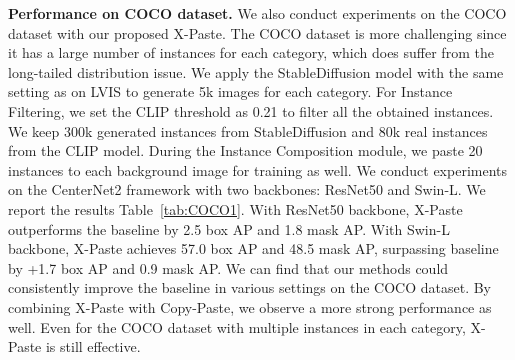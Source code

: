 \documentclass{article}
\begin{document}
\begin{table}[t]
  \small
  \centering
\caption{Comparison of open-vocabulary detection performance on LVIS, $^*$ means they use external supervised data for training.}
\label{tab:openLVIS}
\end{table}


\noindent \textbf{Performance on COCO dataset.} We also conduct experiments on the COCO dataset with our proposed X-Paste. The COCO dataset is more challenging since it has a large number of instances for each category, which does suffer from the long-tailed distribution issue. We apply the StableDiffusion model with the same setting as on LVIS to generate 5k images for each category. For Instance Filtering, we set the CLIP threshold as 0.21 to filter all the obtained instances. We keep 300k generated instances from StableDiffusion and 80k real instances from the CLIP model. During the Instance Composition module, we paste 20 instances to each background image for training as well. We conduct experiments on the CenterNet2 framework with two backbones: ResNet50 and Swin-L. We report the results Table~\ref{tab:COCO1}. With ResNet50 backbone, X-Paste outperforms the baseline by 2.5 box AP and 1.8 mask AP. With Swin-L backbone, X-Paste achieves 57.0 box AP and 48.5 mask AP, surpassing baseline by +1.7 box AP and 0.9 mask AP. We can find that our methods could consistently improve the baseline in various settings on the COCO dataset. By combining X-Paste with Copy-Paste, we observe a more strong performance as well. Even for the COCO dataset with multiple instances in each category, X-Paste is still effective.
\end{document}
